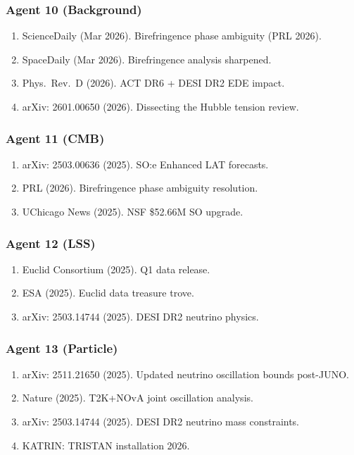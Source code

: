 \documentclass[11pt,a4paper]{article}
\begin{document}
\subsubsection{Agent 10 (Background)}
\begin{enumerate}
\item ScienceDaily (Mar 2026). Birefringence phase ambiguity (PRL 2026).
\item SpaceDaily (Mar 2026). Birefringence analysis sharpened.
\item Phys.\ Rev.\ D (2026). ACT DR6 + DESI DR2 EDE impact.
\item arXiv: 2601.00650 (2026). Dissecting the Hubble tension review.
\end{enumerate}

\subsubsection{Agent 11 (CMB)}
\begin{enumerate}
\item arXiv: 2503.00636 (2025). SO:e Enhanced LAT forecasts.
\item PRL (2026). Birefringence phase ambiguity resolution.
\item UChicago News (2025). NSF \$52.66M SO upgrade.
\end{enumerate}

\subsubsection{Agent 12 (LSS)}
\begin{enumerate}
\item Euclid Consortium (2025). Q1 data release.
\item ESA (2025). Euclid data treasure trove.
\item arXiv: 2503.14744 (2025). DESI DR2 neutrino physics.
\end{enumerate}

\subsubsection{Agent 13 (Particle)}
\begin{enumerate}
\item arXiv: 2511.21650 (2025). Updated neutrino oscillation bounds post-JUNO.
\item Nature (2025). T2K+NOvA joint oscillation analysis.
\item arXiv: 2503.14744 (2025). DESI DR2 neutrino mass constraints.
\item KATRIN: TRISTAN installation 2026.
\end{enumerate}
\end{document}
